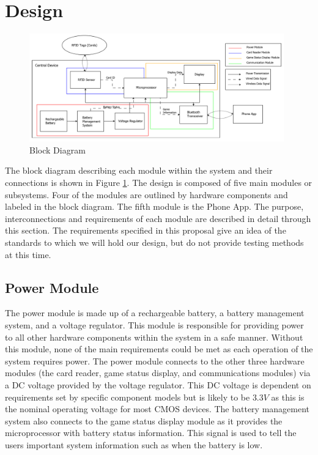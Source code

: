\documentclass[12pt]{article}
\begin{document}
\section{Design}

\begin{figure}[h]
	\centering
	\includegraphics[width=0.98\textwidth]{Full_Block_Diagram_v3.png}
	\caption{Block Diagram}
	\label{fig:block}
\end{figure}

The block diagram describing each module within the system and their connections is shown in Figure \ref{fig:block}. The design is composed of five main modules or subsystems. Four of the modules are outlined by hardware components and labeled in the block diagram. The fifth module is the Phone App. The purpose, interconnections and requirements of each module are described in detail through this section. The requirements specified in this proposal give an idea of the standards to which we will hold our design, but do not provide testing methods at this time.

\subsection{Power Module}

The power module is made up of a rechargeable battery, a battery management system, and a voltage regulator. This module is responsible for providing power to all other hardware components within the system in a safe manner. Without this module, none of the main requirements could be met as each operation of the system requires power. The power module connects to the other three hardware modules (the card reader, game status display, and communications modules) via a DC voltage provided by the voltage regulator. This DC voltage is dependent on requirements set by specific component models but is likely to be $3.3V$ as this is the nominal operating voltage for most CMOS devices. The battery management system also connects to the game status display module as it provides the microprocessor with battery status information. This signal is used to tell the users important system information such as when the battery is low.
\end{document}
